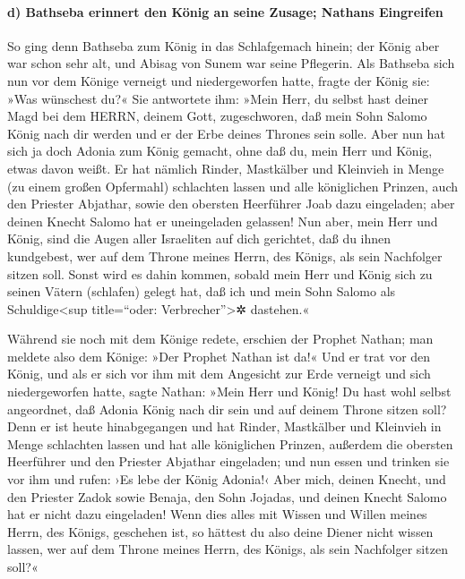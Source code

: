 \hypertarget{d-bathseba-erinnert-den-kuxf6nig-an-seine-zusage-nathans-eingreifen}{%
\paragraph{d) Bathseba erinnert den König an seine Zusage; Nathans
Eingreifen}\label{d-bathseba-erinnert-den-kuxf6nig-an-seine-zusage-nathans-eingreifen}}

So ging denn Bathseba zum König in das Schlafgemach
hinein; der König aber war schon sehr alt, und Abisag von Sunem war
seine Pflegerin. Als Bathseba sich nun vor dem Könige
verneigt und niedergeworfen hatte, fragte der König sie: »Was wünschest
du?« Sie antwortete ihm: »Mein Herr, du selbst hast
deiner Magd bei dem HERRN, deinem Gott, zugeschworen, daß mein Sohn
Salomo König nach dir werden und er der Erbe deines Thrones sein solle.
Aber nun hat sich ja doch Adonia zum König gemacht, ohne
daß du, mein Herr und König, etwas davon weißt. Er hat
nämlich Rinder, Mastkälber und Kleinvieh in Menge (zu einem großen
Opfermahl) schlachten lassen und alle königlichen Prinzen, auch den
Priester Abjathar, sowie den obersten Heerführer Joab dazu eingeladen;
aber deinen Knecht Salomo hat er uneingeladen gelassen!
Nun aber, mein Herr und König, sind die Augen aller
Israeliten auf dich gerichtet, daß du ihnen kundgebest, wer auf dem
Throne meines Herrn, des Königs, als sein Nachfolger sitzen soll.
Sonst wird es dahin kommen, sobald mein Herr und König
sich zu seinen Vätern (schlafen) gelegt hat, daß ich und mein Sohn
Salomo als Schuldige\textless sup title=``oder:
Verbrecher''\textgreater✲ dastehen.«

Während sie noch mit dem Könige redete, erschien der
Prophet Nathan; man meldete also dem Könige: »Der Prophet
Nathan ist da!« Und er trat vor den König, und als er sich vor ihm mit
dem Angesicht zur Erde verneigt und sich niedergeworfen hatte,
sagte Nathan: »Mein Herr und König! Du hast wohl selbst
angeordnet, daß Adonia König nach dir sein und auf deinem Throne sitzen
soll? Denn er ist heute hinabgegangen und hat Rinder,
Mastkälber und Kleinvieh in Menge schlachten lassen und hat alle
königlichen Prinzen, außerdem die obersten Heerführer und den Priester
Abjathar eingeladen; und nun essen und trinken sie vor ihm und rufen:
›Es lebe der König Adonia!‹ Aber mich, deinen Knecht, und
den Priester Zadok sowie Benaja, den Sohn Jojadas, und deinen Knecht
Salomo hat er nicht dazu eingeladen! Wenn dies alles mit
Wissen und Willen meines Herrn, des Königs, geschehen ist, so hättest du
also deine Diener nicht wissen lassen, wer auf dem Throne meines Herrn,
des Königs, als sein Nachfolger sitzen soll?«

